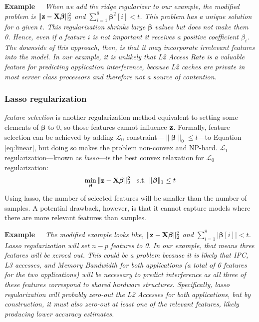 \noindent \textbf{Example~~}\textit{ When we add the ridge regularizer
  to our example, the modified problem is $\|\mathbf{z} -
  \mathbf{X}\boldsymbol{\beta}\|^2_2$ and $\sum_{i=1}^8
  \boldsymbol{\beta}^2[i]<t$. This problem has a unique solution for a
  given $t$. This regularization shrinks large $\boldsymbol{\beta}$
  values but does not make them 0. Hence, even if a feature $i$ is not
  important it receives a positive coefficient $\beta_i$.  The
  downside of this approach, then, is that it may incorporate
  irrelevant features into the model.  In our example, it is unlikely
  that L2 Access Rate is a valuable feature for predicting application
  interference, because L2 caches are private in most server class
  processors and therefore not a source of contention.  }

\subsubsection{Lasso regularization}
\emph{feature selection} is another regularization method equivalent
to setting some elements of $\boldsymbol{\beta}$ to $0$, so those
features cannot influence $\mathbf{z}$.  Formally, feature selection can be
achieved by adding $\mathcal{L}_0$
constraint---$\|\boldsymbol{\beta}\|_0 \leq t$---to Equation
\eqref{eq:linear}, but doing so makes the problem non-convex and
NP-hard.  $\mathcal{L}_1$ regularization---known as \emph{lasso}---is
the best convex relaxation for $\mathcal{L}_0$ regularization:
\begin{equation}
\label{eq:lasso}
\min_{\boldsymbol{\beta}} \|\mathbf{z} - \mathbf{X}\boldsymbol{\beta} \|^2_2 \;\; \text{  s.t.  } \|\boldsymbol{\beta} \|_1 \leq t
\end{equation}
Using lasso, the number of selected features will be smaller than the
number of samples. A potential drawback, however, is that it cannot
capture models where there are more relevant features than samples.

\noindent \textbf{Example~~}\textit{ The modified example looks like,
  $\|\mathbf{z} - \mathbf{X}\boldsymbol{\beta}\|^2_2$ and $\sum_{i=1}^8
  |\boldsymbol{\beta}[i]|<t$. Lasso regularization will set $n-p$
  features to 0.  In our example, that means three features will be
  zeroed out. This could be a problem because it is likely that IPC,
  L3 accesses, and Memory Bandwidth for both applications (\ie a total
  of 6 features for the two applications) will be necessary to predict
  interference as all three of these features correspond to shared
  hardware structures.  Specifically, lasso regularization will
  probably zero-out the L2 Accesses for both applications, but by
  construction, it must also zero-out at least one of the relevant
  features, likely producing lower accuracy estimates.  }

